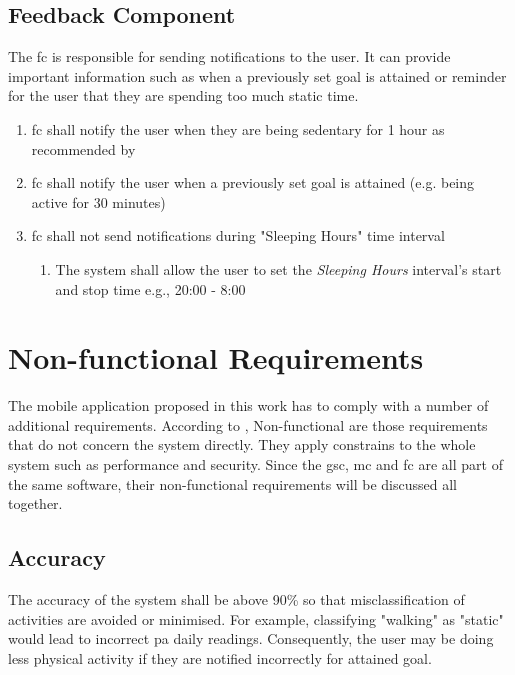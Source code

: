     \subsection{Feedback Component}
    \label{section:feedback-component}
    The \gls{fc} is responsible for sending notifications to the user. It can provide important information such as when a previously set goal is attained or reminder for the user that they are spending too much static time.
    \begin{enumerate}
        \item \gls{fc} shall notify the user when they are being sedentary for 1 hour as recommended by \citet[]{swartz2011}
        
        \item \gls{fc} shall notify the user when a previously set goal is attained (e.g. being active for 30 minutes)
        
        \item \gls{fc} shall not send notifications during "Sleeping Hours" time interval
            \begin{enumerate}
                \item The system shall allow the user to set the \textit{Sleeping Hours} interval's start and stop time e.g., 20:00 - 8:00
            \end{enumerate}
    \end{enumerate}

\section{Non-functional Requirements}
The mobile application proposed in this work has to comply with a number of additional requirements. According to \citet[87]{sommerville2010}, Non-functional are those requirements that do not concern the system directly. They apply constrains to the whole system such as performance and security.  Since the \gls{gsc}, \gls{mc} and \gls{fc} are all part of the same software, their non-functional requirements will be discussed all together.
    
    
    \subsection{Accuracy}
    The accuracy of the system shall be above 90\% so that misclassification of activities are avoided or minimised. For example, classifying "walking" as "static" would lead to incorrect \gls{pa} daily readings. Consequently, the user may be doing less physical activity if they are notified incorrectly for attained goal.
    
